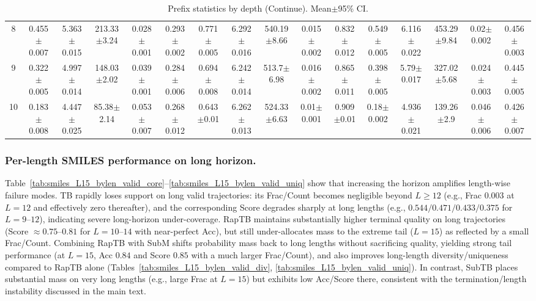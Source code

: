 \documentclass{article}
\theoremstyle{plain}
\theoremstyle{definition}
\theoremstyle{remark}
\begin{document}
\begin{table}[!htbp]
{\begin{tabular}{cccccccccccccccc}
8 & 0.455$\pm$0.007 & 5.363$\pm$0.015 & 213.33$\pm$3.24 & 0.028$\pm$0.001 & 0.293$\pm$0.002 & 0.771$\pm$0.005 & 6.292$\pm$0.016 & 540.19$\pm$8.66 & 0.015$\pm$0.002 & 0.832$\pm$0.012 & 0.549$\pm$0.005 & 6.116$\pm$0.022 & 453.29$\pm$9.84 & 0.02$\pm$0.002 & 0.456$\pm$0.003 \\
9 & 0.322$\pm$0.005 & 4.997$\pm$0.014 & 148.03$\pm$2.02 & 0.039$\pm$0.001 & 0.284$\pm$0.006 & 0.694$\pm$0.008 & 6.242$\pm$0.014 & 513.7$\pm$6.98 & 0.016$\pm$0.002 & 0.865$\pm$0.011 & 0.398$\pm$0.005 & 5.79$\pm$0.017 & 327.02$\pm$5.68 & 0.024$\pm$0.003 & 0.445$\pm$0.005 \\
10 & 0.183$\pm$0.008 & 4.447$\pm$0.025 & 85.38$\pm$2.14 & 0.053$\pm$0.007 & 0.268$\pm$0.012 & 0.643$\pm$0.01 & 6.262$\pm$0.013 & 524.33$\pm$6.63 & 0.01$\pm$0.001 & 0.909$\pm$0.01 & 0.18$\pm$0.002 & 4.936$\pm$0.021 & 139.26$\pm$2.9 & 0.046$\pm$0.006 & 0.426$\pm$0.007 \\
\bottomrule
\end{tabular}
}%
\caption{Prefix statistics by depth (Continue). Mean$\pm$95\% CI.}
\label{tab:prefix_bylen_subm}
\end{table}

\subsubsection{Per-length SMILES performance on long horizon.}
Table~\ref{tab:smiles_L15_bylen_valid_core}--\ref{tab:smiles_L15_bylen_valid_uniq} show that increasing the horizon amplifies length-wise failure modes.
TB rapidly loses support on long valid trajectories: its Frac/Count becomes negligible beyond $L\ge 12$ (e.g., Frac $0.003$ at $L=12$ and effectively zero thereafter), and the corresponding Score degrades sharply at long lengths (e.g., $0.544/0.471/0.433/0.375$ for $L=9$--$12$), indicating severe long-horizon under-coverage.
RapTB maintains substantially higher terminal quality on long trajectories (Score $\approx 0.75$--$0.81$ for $L=10$--$14$ with near-perfect Acc), but still under-allocates mass to the extreme tail ($L=15$) as reflected by a small Frac/Count.
Combining RapTB with SubM shifts probability mass back to long lengths without sacrificing quality, yielding strong tail performance (at $L=15$, Acc $0.84$ and Score $0.85$ with a much larger Frac/Count), and also improves long-length diversity/uniqueness compared to RapTB alone (Tables~\ref{tab:smiles_L15_bylen_valid_div}, \ref{tab:smiles_L15_bylen_valid_uniq}).
In contrast, SubTB places substantial mass on very long lengths (e.g., large Frac at $L=15$) but exhibits low Acc/Score there, consistent with the termination/length instability discussed in the main text.
\label{app:results_smiles_L15_main}
\end{document}
